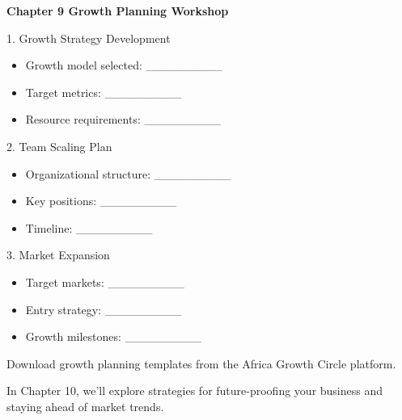 \begin{workshopbox}
\textbf{Chapter 9 Growth Planning Workshop}

1. Growth Strategy Development
\begin{itemize}
    \item Growth model selected: \_\_\_\_\_\_\_\_\_
    \item Target metrics: \_\_\_\_\_\_\_\_\_
    \item Resource requirements: \_\_\_\_\_\_\_\_\_
\end{itemize}

2. Team Scaling Plan
\begin{itemize}
    \item Organizational structure: \_\_\_\_\_\_\_\_\_
    \item Key positions: \_\_\_\_\_\_\_\_\_
    \item Timeline: \_\_\_\_\_\_\_\_\_
\end{itemize}

3. Market Expansion
\begin{itemize}
    \item Target markets: \_\_\_\_\_\_\_\_\_
    \item Entry strategy: \_\_\_\_\_\_\_\_\_
    \item Growth milestones: \_\_\_\_\_\_\_\_\_
\end{itemize}

Download growth planning templates from the Africa Growth Circle platform.
\end{workshopbox}

\begin{importantbox}
In Chapter 10, we'll explore strategies for future-proofing your business and staying ahead of market trends.
\end{importantbox}